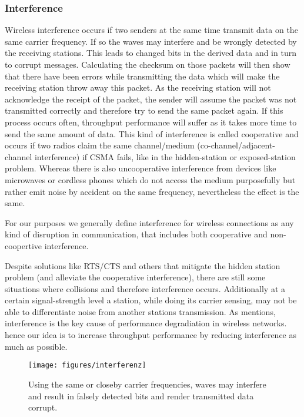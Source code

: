       \subsubsection{Interference}
	Wireless interference occurs if two senders at the same time transmit data on the same carrier frequency. If so the waves may interfere and be wrongly detected
	by the receiving stations. This leads to changed bits in the derived data and in turn to corrupt messages. Calculating the checksum on those packets will then 
	show that there have been errors while transmitting the data which will make the receiving station throw away this packet.
	As the receiving station will not acknowledge the receipt of the packet, the sender will assume the packet was not transmitted correctly and therefore try 
	to send the same packet again. If this process occurs often, throughput performance will suffer as it takes more time to send the same amount of data.
	This kind of interference is called cooperative and occurs if two radios claim the same channel/medium (co-channel/adjacent-channel interference) if CSMA fails,
	like in the hidden-station or exposed-station problem.
	Whereas there is also uncooperative interference from devices like microwaves or cordless phones which do not access the medium purposefully but rather
	emit noise by accident on the same frequency, nevertheless the effect is the same.
	
	For our purposes we generally define interference for wireless connections as any kind of disruption in communication, 
	that includes both cooperative and non-coopertive interference.
	
	Despite solutions like RTS/CTS and others that mitigate the hidden station problem (and alleviate the cooperative interference),
	there are still some situations where collisions and therefore interference occurs.
	Additionally at a certain signal-strength level a station, while doing its carrier sensing, may not be able to differentiate noise from another stations transmission.
	As \cite{padhye2005estimation} mentions, interference is the key cause of performance degradiation in wireless networks. hence our idea is to increase throughput 
	performance by reducing interference as much as possible.
	
	\begin{figure}[h!]
	  \centering
	  \texttt{[image: figures/interferenz]}
	  \caption{Using the same or closeby carrier frequencies, waves may interfere and result in falsely detected bits and render transmitted data corrupt.}
	  \label{fig:interferenz}
	\end{figure}
	
